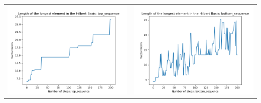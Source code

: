 \documentclass[10pt]{article}
\begin{document}
\begin{tabular}{c|c}
\begin{minipage}{.4\textwidth}
\includegraphics[width=\textwidth]{"DATA/5d/6 generators 2 bound C/top_sequence LENGTH"}
\end{minipage} &
\begin{minipage}{.4\textwidth}
\includegraphics[width=\textwidth]{"DATA/5d/6 generators 2 bound C bottomup/bottom_sequence LENGTH"}
\end{minipage}
\end{tabular}
\end{document}
